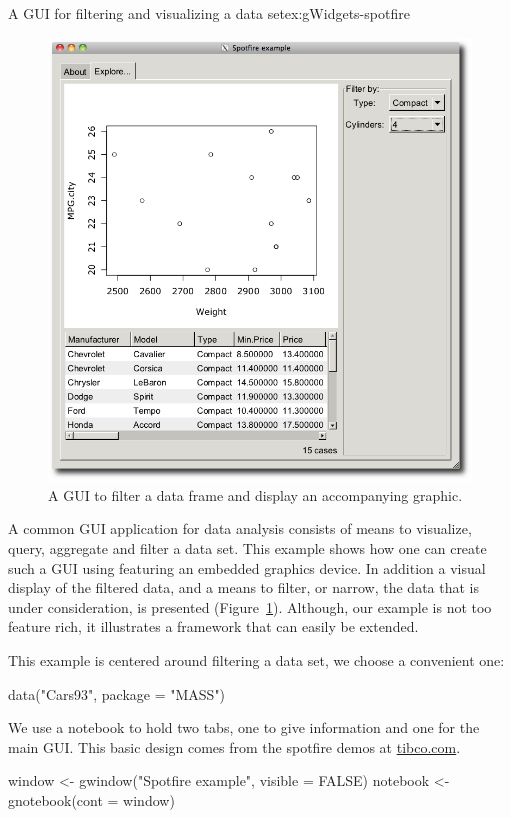\begin{example}{A GUI for filtering and visualizing a data set}{ex:gWidgets-spotfire}
\begin{figure}
  \centering
  \includegraphics[width=.6\textwidth]{fig-gWidgets-spotfire-gui}
  \caption{A GUI to filter a data frame and display an accompanying graphic.}
  \label{fig:gWidgets-spotfire-gui}
\end{figure}
A common GUI application for data analysis consists of means to
visualize, query, aggregate and filter a data set. This example shows
how one can create such a GUI using  featuring an
embedded graphics device. In addition a visual display of the filtered
data, and a means to filter, or narrow, the data that is under
consideration, is presented (Figure~\ref{fig:gWidgets-spotfire-gui}).
Although, our example is not too feature rich, it illustrates a
framework that can easily be extended.


This example is centered around filtering a data set, we choose a
convenient one:
\begin{Schunk}
\begin{Sinput}
 data("Cars93", package = "MASS")
\end{Sinput}
\end{Schunk}

We use a notebook to hold two tabs, one to give information and one
for the main GUI. This basic design comes from the spotfire demos at \url{tibco.com}.
\begin{Schunk}
\begin{Sinput}
 window <- gwindow("Spotfire example", visible = FALSE)
 notebook <- gnotebook(cont = window)
\end{Sinput}
\end{Schunk}



\end{example}
